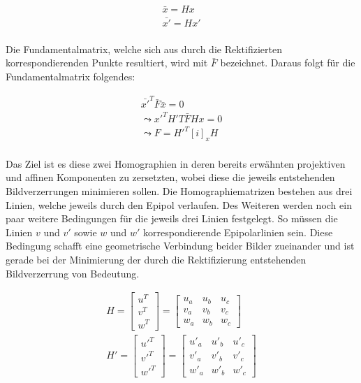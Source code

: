 \begin{gather}
	\bar{x}= Hx\\
	\bar{x'}= Hx'
\end{gather}\\

Die Fundamentalmatrix, welche sich aus durch die Rektifizierten korrespondierenden Punkte resultiert, wird mit $\bar{F}$ bezeichnet. Daraus folgt für die Fundamentalmatrix folgendes\cite{ZZ,phdextrinsicPara}:

\begin{gather}
	\bar{x'}^T\bar{F}\bar{x} = 0\\
	\leadsto x'^TH'T\bar{F}Hx=0\\
	\leadsto F = H'^T[i]_xH
\end{gather}\\

Das Ziel ist es diese zwei Homographien in deren bereits erwähnten projektiven und affinen Komponenten zu zersetzten, wobei diese die jeweils entstehenden Bildverzerrungen minimieren sollen. Die Homographiematrizen bestehen aus drei Linien, welche jeweils durch den Epipol verlaufen. Des Weiteren werden noch ein paar weitere Bedingungen für die jeweils drei Linien festgelegt. So müssen die Linien $v$ und $v'$ sowie $w$ und $w'$ korrespondierende Epipolarlinien sein. Diese Bedingung schafft eine geometrische Verbindung beider Bilder zueinander und ist gerade bei der Minimierung der durch die Rektifizierung entstehenden Bildverzerrung von Bedeutung.

\begin{gather}
H = \begin{bmatrix}
u^T\\v^T\\w^T
\end{bmatrix} =
\begin{bmatrix}
u_a&u_b&u_c\\
v_a&v_b&v_c\\
w_a&w_b&w_c
\end{bmatrix}\\
H' = \begin{bmatrix}
u'^T\\v'^T\\w'^T
\end{bmatrix} =
\begin{bmatrix}
u'_a&u'_b&u'_c\\
v'_a&v'_b&v'_c\\
w'_a&w'_b&w'_c
\end{bmatrix}	
\end{gather}\\

